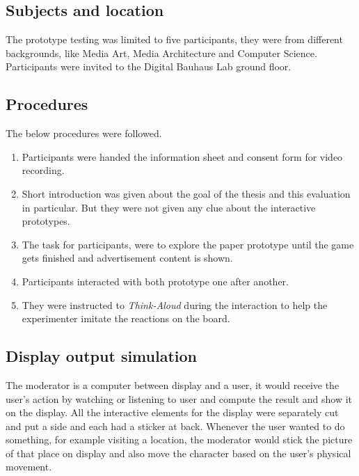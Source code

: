 \subsection{Subjects and location}
The prototype testing was limited to five participants, they were from different backgrounds, like Media Art, Media Architecture and Computer Science. Participants were invited to the Digital Bauhaus Lab ground floor.


\subsection{Procedures}

The below procedures were followed.

\begin{enumerate}
\item Participants were handed the information sheet and consent form for video recording.
\item Short introduction was given about the goal of the thesis and this evaluation in particular. But they were not given any clue about the interactive prototypes.
\item The task for participants, were to explore the paper prototype until the game gets finished and advertisement content is shown.
\item Participants interacted with both prototype one after another.
\item They were instructed to \emph{Think-Aloud} during the interaction to help the experimenter imitate the reactions on the board.
\end{enumerate}



\subsection{Display output simulation}
The moderator is a computer between display and a user, it would receive the user’s action by watching or listening to user and compute the result and show it on the display. All the interactive elements for the display were separately cut and put a side and each had a sticker at back. Whenever the user wanted to do something, for example visiting a location, the moderator would stick the picture of that place on display and also move the character based on the user’s physical movement.

